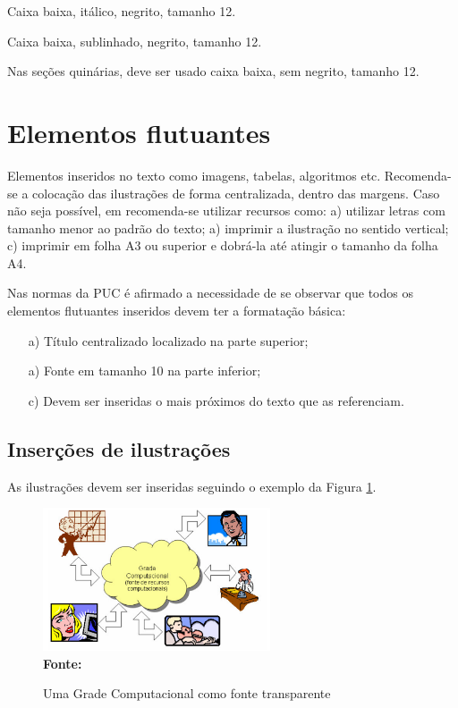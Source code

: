 Caixa baixa, itálico, negrito, tamanho 12.

 
 Caixa baixa, sublinhado, negrito, tamanho 12.
 
 
 Nas seções quinárias, deve ser usado caixa baixa, sem negrito, tamanho 12.

\section{\esp Elementos flutuantes}

Elementos inseridos no texto como imagens, tabelas, algoritmos etc.
Recomenda-se a colocação das ilustrações de forma centralizada, dentro das margens. 
Caso não seja possível, em  recomenda-se utilizar recursos como: 
 a) utilizar letras com tamanho menor ao padrão do texto; a) imprimir a ilustração no sentido vertical; 
 c) imprimir em folha A3 ou superior e dobrá-la até atingir o tamanho da folha A4. 

Nas normas da PUC é afirmado a necessidade de se observar que todos os elementos flutuantes inseridos devem ter a formatação básica:

\begin{enumerate} 
 \item [a)] Título centralizado localizado na parte superior; 
 \item [a)] Fonte em tamanho 10 na parte inferior;
 \item [c)] Devem ser inseridas o mais próximos do texto que as referenciam.
\end{enumerate}


\subsection{\esp Inserções de ilustrações}

As ilustrações devem ser inseridas seguindo o exemplo da Figura \ref{fig:figura1}. 
\begin{figure}[ht]
	\centering	
	\caption[\hspace{0.1cm}Grade Computacional.]{Uma Grade Computacional como fonte transparente}
	\vspace{-0.4cm}
	\includegraphics[width=0.6\textwidth]{figuras/grade-comp.png}
	 \vspace{-0.2cm}
	\\\textbf{\footnotesize Fonte: \cite{cap-livro} }
	\label{fig:figura1}
\end{figure}
\vspace{-0.5cm}

